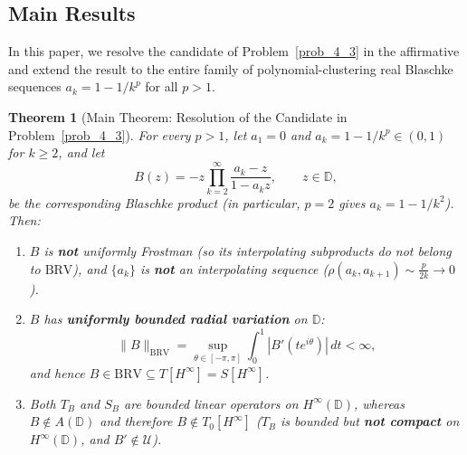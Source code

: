 \documentclass[11pt,reqno]{amsart}
\newtheorem{thm}{Theorem}[section]
\numberwithin{equation}{section}
\newcommand{\D}{\mathbb{D}}
\newcommand{\BRV}{\mathrm{BRV}}
\begin{document}
\subsection{Main Results}

In this paper, we resolve the candidate of Problem~\ref{prob_4_3} in the affirmative and extend the result to the entire family of polynomial-clustering real Blaschke sequences $a_k = 1 - 1/k^p$ for all $p > 1$.

\begin{thm}[Main Theorem: Resolution of the Candidate in Problem~\ref{prob_4_3}] \label{thm_main}
For every $p > 1$, let $a_1 = 0$ and $a_k = 1 - 1/k^p \in (0, 1)$ for $k \ge 2$, and let
\begin{equation} \label{eq_Bp_def}
  B(z) = -z \prod_{k=2}^\infty \frac{a_k - z}{1 - a_k z}, \qquad z \in \D,
\end{equation}
be the corresponding Blaschke product (in particular, $p = 2$ gives $a_k = 1 - 1/k^2$). Then:
\begin{enumerate}
\item $B$ is \textbf{not} uniformly Frostman (so its interpolating subproducts do not belong to $\BRV$), and $\{a_k\}$ is \textbf{not} an interpolating sequence ($\rho(a_k, a_{k+1}) \sim \frac{p}{2k} \to 0$).
\item $B$ has \textbf{uniformly bounded radial variation} on $\D$:
\begin{equation} \label{eq_main_BRV}
  \|B\|_{\BRV} = \sup_{\theta \in [-\pi, \pi]} \int_0^1 |B'(t e^{i\theta})|\,dt < \infty,
\end{equation}
and hence $B \in \BRV \subseteq T[H^\infty] = S[H^\infty]$.
\item Both $T_B$ and $S_B$ are bounded linear operators on $H^\infty(\D)$, whereas $B \notin A(\D)$ and therefore $B \notin T_0[H^\infty]$ ($T_B$ is bounded but \textbf{not compact} on $H^\infty(\D)$, and $B' \notin \mathcal{U}$).
\end{enumerate}
\end{thm}
\end{document}
